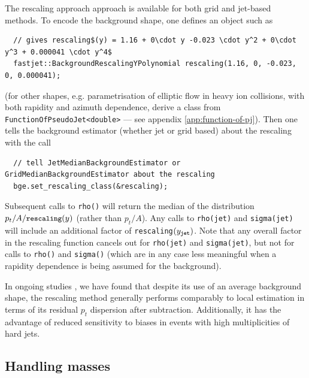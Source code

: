 \documentclass[12pt,a4]{article}
\newcommand{\ttt}[1]{{\small\texttt{#1}}}
\begin{document}
The rescaling approach approach is available for both grid and
jet-based methods.
%
To encode the background shape, one defines an object such as 
\begin{lstlisting}
  // gives rescaling$(y) = 1.16 + 0\cdot y -0.023 \cdot y^2 + 0\cdot y^3 + 0.000041 \cdot y^4$
  fastjet::BackgroundRescalingYPolynomial rescaling(1.16, 0, -0.023, 0, 0.000041);
\end{lstlisting}
(for other shapes, e.g. parametrisation of elliptic flow in heavy ion
collisions, with both rapidity and azimuth dependence, derive a class
from \ttt{FunctionOfPseudoJet<double>} --- see appendix
\ref{app:function-of-pj}). Then one tells the background estimator
(whether jet or grid based) about the rescaling with the call
\begin{lstlisting}
  // tell JetMedianBackgroundEstimator or GridMedianBackgroundEstimator about the rescaling
  bge.set_rescaling_class(&rescaling);
\end{lstlisting}
Subsequent calls to \ttt{rho()} will return the median of the
distribution $p_t/A / \ttt{rescaling}(y)$ (rather than $p_t/A$).
%
Any calls to \ttt{rho(jet)} and \ttt{sigma(jet)} will include an
additional factor of \ttt{rescaling}$(y_\ttt{jet})$.
%
Note that any overall factor in the rescaling function cancels out for
\ttt{rho(jet)} and \ttt{sigma(jet)}, but not for calls to \ttt{rho()}
and \ttt{sigma()} (which are in any case less meaningful when a
rapidity dependence is being assumed for the background).

In ongoing studies \cite{GridMedianLH}, we have found that despite its
use of an average background shape, the rescaling method generally
performs comparably to local estimation in terms of its residual $p_t$
dispersion after subtraction.
%
Additionally, it has the advantage of reduced sensitivity to biases in
events with high multiplicities of hard jets.

\subsection{Handling masses}
\label{sec:BGE-masses}
\end{document}

